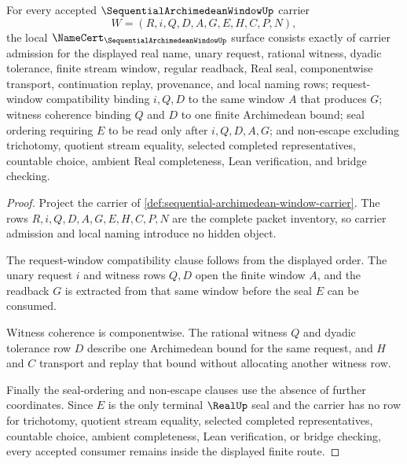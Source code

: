 \begin{theorem}
\label{thm:sequential-archimedean-window-namecert-obligations}
For every accepted $\SequentialArchimedeanWindowUp$ carrier
$$
W=(R,i,Q,D,A,G,E,H,C,P,N),
$$
the local $\NameCert_{\SequentialArchimedeanWindowUp}$ surface consists exactly of carrier admission for the displayed real name, unary request, rational witness, dyadic tolerance, finite stream window, regular readback, Real seal, componentwise transport, continuation replay, provenance, and local naming rows; request-window compatibility binding $i,Q,D$ to the same window $A$ that produces $G$; witness coherence binding $Q$ and $D$ to one finite Archimedean bound; seal ordering requiring $E$ to be read only after $i,Q,D,A,G$; and non-escape excluding trichotomy, quotient stream equality, selected completed representatives, countable choice, ambient Real completeness, Lean verification, and bridge checking.
\end{theorem}
\begin{proof}
Project the carrier of \autoref{def:sequential-archimedean-window-carrier}. The rows $R,i,Q,D,A,G,E,H,C,P,N$ are the complete packet inventory, so carrier admission and local naming introduce no hidden object.

The request-window compatibility clause follows from the displayed order. The unary request $i$ and witness rows $Q,D$ open the finite window $A$, and the readback $G$ is extracted from that same window before the seal $E$ can be consumed.

Witness coherence is componentwise. The rational witness $Q$ and dyadic tolerance row $D$ describe one Archimedean bound for the same request, and $H$ and $C$ transport and replay that bound without allocating another witness row.

Finally the seal-ordering and non-escape clauses use the absence of further coordinates. Since $E$ is the only terminal $\RealUp$ seal and the carrier has no row for trichotomy, quotient stream equality, selected completed representatives, countable choice, ambient completeness, Lean verification, or bridge checking, every accepted consumer remains inside the displayed finite route.
\end{proof}


